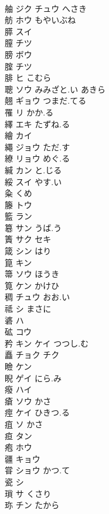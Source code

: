 \documentclass[8pt]{extreport}
\begin{document}
\begin{CJK}{UTF8}{min}
\\	舳	ジク チュウ へさき			
\\	舫	ホウ もやいぶね			
\\	膵	スイ			
\\	膣	チツ			
\\	膀	ボウ			
\\	腟	チツ			
\\	腓	ヒ こむら			
\\	聰	ソウ みみざと.い あきら			
\\	翹	ギョウ つまだ.てる			
\\	罹	リ かか.る			
\\	繹	エキ たずね.る			
\\	繪	カイ			
\\	繩	ジョウ ただ.す			
\\	繚	リョウ めぐ.る			
\\	緘	カン と.じる			
\\	綏	スイ やす.い			
\\	粂	くめ			
\\	籐	トウ			
\\	籃	ラン			
\\	簒	サン うば.う			
\\	簀	サク セキ			
\\	箴	シン はり			
\\	箟	キン					
\\	箒	ソウ ほうき			
\\	筧	ケン かけひ			
\\	稠	チュウ おお.い			
\\	祗	シ まさに			
\\	碆	ハ			
\\	砿	コウ			
\\	矜	キン ケイ つつし.む			
\\	矗	チョク チク			
\\	瞼	ケン			
\\	睨	ゲイ にら.み			
\\	癈	ハイ			
\\	瘡	ソウ かさ			
\\	痙	ケイ ひきつ.る			
\\	疽	ソ かさ			
\\	疸	タン			
\\	疱	ホウ			
\\	疆	キョウ			
\\	甞	ショウ かつ.て			
\\	瓷	シ			
\\	瑣	サ くさり			
\\	珎	チン たから					

\end{CJK}
\end{document}
